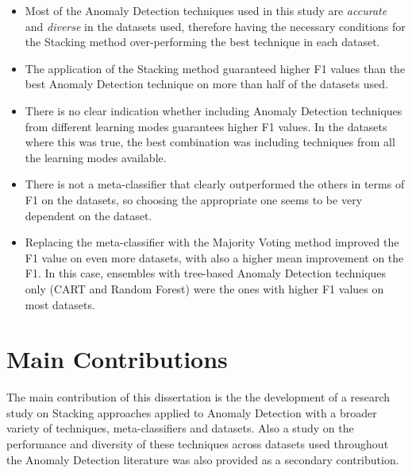 \begin{itemize}
	
	\item Most of the Anomaly Detection techniques used in this study are \textit{accurate} and \textit{diverse} in the datasets used, therefore having the necessary conditions for the Stacking method over-performing the best technique in each dataset.
	\item The application of the Stacking method guaranteed higher F1 values than the best Anomaly Detection technique on more than half of the datasets used.
	\item There is no clear indication whether including Anomaly Detection techniques from different learning modes guarantees higher F1 values. In the datasets where this was true, the best combination was including techniques from all the learning modes available.
	\item There is not a meta-classifier that clearly outperformed the others in terms of F1 on the datasets, so choosing the appropriate one seems to be very dependent on the dataset.
	\item Replacing the meta-classifier with the Majority Voting method improved the F1 value on even more datasets, with also a higher mean improvement on the F1. In this case, ensembles with tree-based Anomaly Detection techniques only (CART and Random Forest) were the ones with higher F1 values on most datasets.
\end{itemize}

\section{Main Contributions}

The main contribution of this dissertation is the the development of a research study on Stacking approaches applied to Anomaly Detection with a broader variety of techniques, meta-classifiers and datasets.
Also a study on the performance and diversity of these techniques across datasets used throughout the Anomaly Detection literature was also provided as a secondary contribution.

